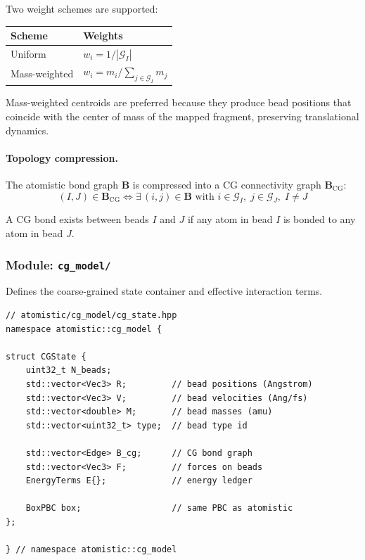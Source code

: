 \documentclass[11pt]{article}
\begin{document}
Two weight schemes are supported:

\begin{center}
\begin{tabular}{ll}
\toprule
\textbf{Scheme} & \textbf{Weights} \\
\midrule
Uniform & $w_i = 1/|\mathcal{G}_I|$ \\
Mass-weighted & $w_i = m_i / \sum_{j \in \mathcal{G}_I} m_j$ \\
\bottomrule
\end{tabular}
\end{center}

Mass-weighted centroids are preferred because they produce bead positions
that coincide with the center of mass of the mapped fragment, preserving
translational dynamics.

\paragraph{Topology compression.}

The atomistic bond graph $\mathbf{B}$ is compressed into a CG connectivity
graph $\mathbf{B}_\text{CG}$:
\begin{equation}
  (I, J) \in \mathbf{B}_\text{CG} \iff \exists\, (i, j) \in \mathbf{B}
  \text{ with } i \in \mathcal{G}_I,\; j \in \mathcal{G}_J,\; I \neq J
\end{equation}

A CG bond exists between beads $I$ and $J$ if any atom in bead $I$ is
bonded to any atom in bead $J$.

\subsubsection{Module: \texttt{cg\_model/}}

Defines the coarse-grained state container and effective interaction terms.

\begin{lstlisting}
// atomistic/cg_model/cg_state.hpp
namespace atomistic::cg_model {

struct CGState {
    uint32_t N_beads;
    std::vector<Vec3> R;         // bead positions (Angstrom)
    std::vector<Vec3> V;         // bead velocities (Ang/fs)
    std::vector<double> M;       // bead masses (amu)
    std::vector<uint32_t> type;  // bead type id

    std::vector<Edge> B_cg;      // CG bond graph
    std::vector<Vec3> F;         // forces on beads
    EnergyTerms E{};             // energy ledger

    BoxPBC box;                  // same PBC as atomistic
};

} // namespace atomistic::cg_model
\end{lstlisting}
\end{document}
